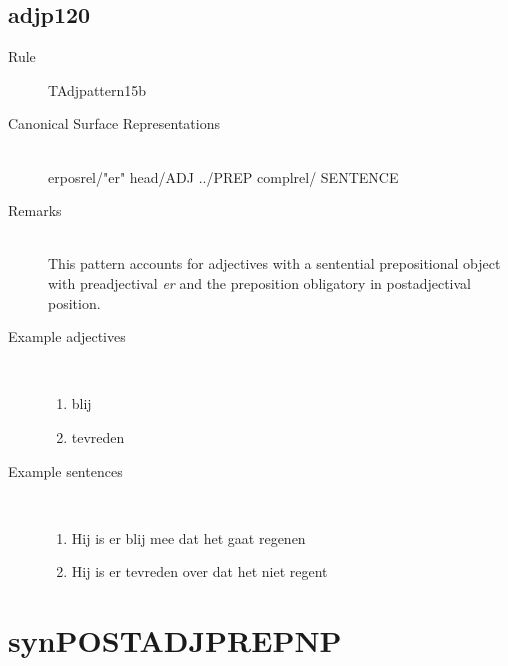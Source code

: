   \subsection{adjp120}
\begin{description}
  \item [Rule] TAdjpattern15b
  \item [Canonical Surface Representations] \mbox{}\\ erposrel/"er" head/ADJ ../PREP complrel/
SENTENCE
  \item [Remarks] \mbox{}\\ This pattern accounts for adjectives with a sentential 
prepositional object with preadjectival {\em er} and the preposition 
obligatory in postadjectival position. 

  \item [Example adjectives] \mbox{}\\
\begin{enumerate}
  \item blij
  \item tevreden
\end{enumerate}
  \item [Example sentences]\mbox{}\\
\begin{enumerate}
  \item Hij is er blij mee dat het gaat regenen 
  \item Hij is er tevreden over dat het niet regent
\end{enumerate}
\end{description}
\newpage
\section{synPOSTADJPREPNP}
